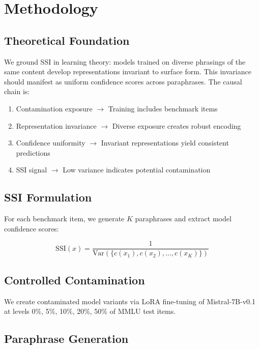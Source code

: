 \section{Methodology}

\subsection{Theoretical Foundation}

We ground SSI in learning theory: models trained on diverse phrasings of the same content develop representations invariant to surface form. This invariance should manifest as uniform confidence scores across paraphrases. The causal chain is:

\begin{enumerate}
    \item Contamination exposure $\rightarrow$ Training includes benchmark items
    \item Representation invariance $\rightarrow$ Diverse exposure creates robust encoding
    \item Confidence uniformity $\rightarrow$ Invariant representations yield consistent predictions
    \item SSI signal $\rightarrow$ Low variance indicates potential contamination
\end{enumerate}

\subsection{SSI Formulation}

For each benchmark item, we generate $K$ paraphrases and extract model confidence scores:

\begin{equation}
\text{SSI}(x) = \frac{1}{\text{Var}(\{c(x_1), c(x_2), \ldots, c(x_K)\})}
\end{equation}

\subsection{Controlled Contamination}

We create contaminated model variants via LoRA fine-tuning of Mistral-7B-v0.1 at levels 0\%, 5\%, 10\%, 20\%, 50\% of MMLU test items.

\subsection{Paraphrase Generation}

